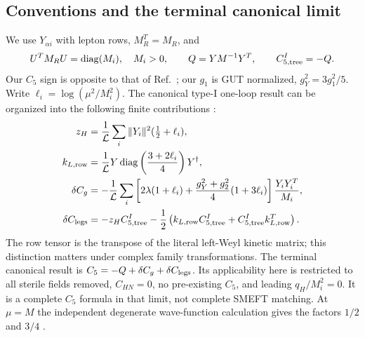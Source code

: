 \documentclass[11pt]{article}
\newcommand{\diag}{\operatorname{diag}}
\newcommand{\LOOP}{\mathcal L}
\begin{document}
\subsection{Conventions and the terminal canonical limit}
We use $Y_{\alpha i}$ with lepton rows, $M_R^T=M_R$, and
\begin{equation}
 U^TM_RU=\diag(M_i),\quad M_i>0,\qquad
 Q=YM^{-1}Y^T,\qquad C_{5,\rm tree}^{I}=-Q.
\end{equation}
Our $C_5$ sign is opposite to that of Ref.~\cite{zhangzhou}; our $g_1$
is GUT normalized, $g_Y^2=3g_1^2/5$. Write
$\ell_i=\log(\mu^2/M_i^2)$. The canonical type-I one-loop result can be
organized into the following finite contributions
\cite{zhangzhou}:
\begin{align}
 z_H&=\frac1{\LOOP}\sum_i\|Y_i\|^2(\tfrac12+\ell_i),\\
 k_{L,\rm row}&=\frac1{\LOOP}Y\diag\left(\frac{3+2\ell_i}{4}\right)Y^\dagger,\\
 \delta C_g&=-\frac1{\LOOP}\sum_i
 \left[2\lambda(1+\ell_i)+\frac{g_Y^2+g_2^2}{4}(1+3\ell_i)\right]
 \frac{Y_iY_i^T}{M_i},\label{eq:finiteC}\\
 \delta C_{\rm legs}&=-z_H C_{5,\rm tree}^{I}
 -\frac12\left(k_{L,\rm row}C_{5,\rm tree}^{I}
              +C_{5,\rm tree}^{I}k_{L,\rm row}^T\right).
\end{align}
The row tensor is the transpose of the literal left-Weyl kinetic matrix;
this distinction matters under complex family transformations. The
terminal canonical result is $C_5=-Q+\delta C_g+\delta C_{\rm legs}$.
Its applicability here is restricted to all sterile fields removed,
$C_{HN}=0$, no pre-existing $C_5$, and leading $q_H/M_i^2=0$.
It is a complete $C_5$ formula in that limit, not complete SMEFT matching.
At $\mu=M$ the independent degenerate wave-function calculation gives
the factors $1/2$ and $3/4$ \cite{ohlsson}.
\end{document}

